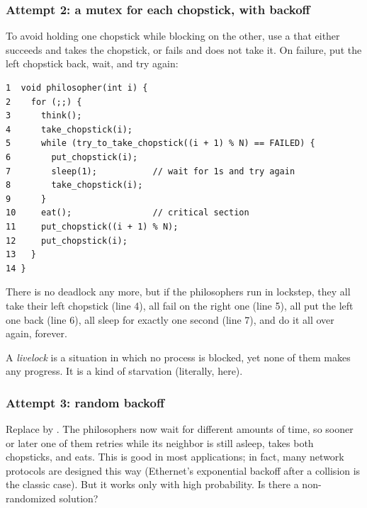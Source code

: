 \subsubsection{Attempt 2: a mutex for each chopstick, with backoff}
To avoid holding one chopstick while blocking on the other, use a  that either succeeds and takes the chopstick, or fails and does not take it. On failure, put the left chopstick back, wait, and try again:
\begin{lstlisting}
1  void philosopher(int i) {
2    for (;;) {
3      think();
4      take_chopstick(i);
5      while (try_to_take_chopstick((i + 1) % N) == FAILED) {
6        put_chopstick(i);
7        sleep(1);           // wait for 1s and try again
8        take_chopstick(i);
9      }
10     eat();                // critical section
11     put_chopstick((i + 1) % N);
12     put_chopstick(i);
13   }
14 }
\end{lstlisting}
There is no deadlock any more, but if the philosophers run in lockstep, they all take their left chopstick (line 4), all fail on the right one (line 5), all put the left one back (line 6), all sleep for exactly one second (line 7), and do it all over again, forever.

\begin{definition}[Livelock]
  A \emph{livelock} is a situation in which no process is blocked, yet none of them makes any progress. It is a kind of starvation (literally, here).
\end{definition}

\subsubsection{Attempt 3: random backoff}
Replace  by . The philosophers now wait for different amounts of time, so sooner or later one of them retries while its neighbor is still asleep, takes both chopsticks, and eats. This is good in most applications; in fact, many network protocols are designed this way (Ethernet's exponential backoff after a collision is the classic case). But it works only with high probability. Is there a non-randomized solution?

